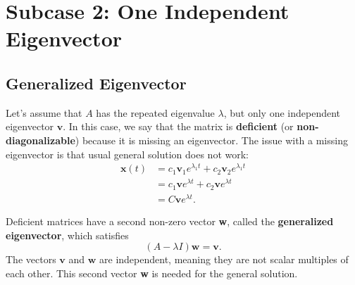 \documentclass[11pt,letterpaper]{article}
\begin{document}
\pagebreak
\section{Subcase 2: One Independent Eigenvector}


\subsection{Generalized Eigenvector}

Let's assume that $A$ has the repeated eigenvalue $\lambda$, but only one independent eigenvector $\mathbf{v}$. In this case, we say that the matrix is \textbf{deficient} (or \textbf{non-diagonalizable}) because it is missing an eigenvector. The issue with a missing eigenvector is that usual general solution does not work:
\begin{align*}    
\mathbf{x}(t) &= c_1 \mathbf{v}_1 e^{\lambda_1 t} + c_2 \mathbf{v}_2 e^{\lambda_1 t}\\
     &= c_1 \mathbf{v} e^{\lambda t} + c_2 \mathbf{v} e^{\lambda t}\\
    &=C\textbf{v}e^{\lambda t}.
\end{align*}

Deficient matrices have a second non-zero vector \textbf{w}, called the \textbf{generalized eigenvector}, which satisfies 
    \[
    \boxed{(A-\lambda I)\mathbf{w}=\mathbf{v}.}
    \]
The vectors $\textbf{v}$ and $\textbf{w}$ are independent, meaning they are not scalar multiples of each other. This second vector \textbf{w} is needed for the general solution.

\end{document}
